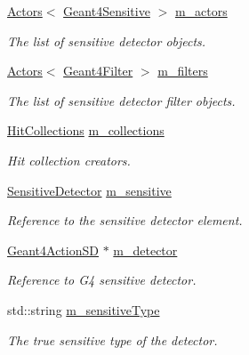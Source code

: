 \begin{DoxyCompactItemize}
\hyperlink{class_d_d4hep_1_1_simulation_1_1_geant4_action_1_1_actors}{Actors}$<$ \hyperlink{class_d_d4hep_1_1_simulation_1_1_geant4_sensitive}{Geant4\+Sensitive} $>$ \hyperlink{class_d_d4hep_1_1_simulation_1_1_geant4_sens_det_action_sequence_aa383f58ddce351dc9df9451bee3feb0f}{m\+\_\+actors}
\begin{DoxyCompactList}\small\item\em The list of sensitive detector objects. \end{DoxyCompactList}\item 
\hyperlink{class_d_d4hep_1_1_simulation_1_1_geant4_action_1_1_actors}{Actors}$<$ \hyperlink{class_d_d4hep_1_1_simulation_1_1_geant4_filter}{Geant4\+Filter} $>$ \hyperlink{class_d_d4hep_1_1_simulation_1_1_geant4_sens_det_action_sequence_a67b12a0e51d5249be593f874182155ab}{m\+\_\+filters}
\begin{DoxyCompactList}\small\item\em The list of sensitive detector filter objects. \end{DoxyCompactList}\item 
\hyperlink{class_d_d4hep_1_1_simulation_1_1_geant4_sens_det_action_sequence_aabeb325e4b6af156cbae3578b00301b3}{Hit\+Collections} \hyperlink{class_d_d4hep_1_1_simulation_1_1_geant4_sens_det_action_sequence_a58c74511f9bef97e83b5a7e54b4917ca}{m\+\_\+collections}
\begin{DoxyCompactList}\small\item\em Hit collection creators. \end{DoxyCompactList}\item 
\hyperlink{class_d_d4hep_1_1_simulation_1_1_geant4_sens_det_action_sequence_a9d428afdc7b9189bce5dab4f16db17fb}{Sensitive\+Detector} \hyperlink{class_d_d4hep_1_1_simulation_1_1_geant4_sens_det_action_sequence_a480029ca979ac872688986da731930b8}{m\+\_\+sensitive}
\begin{DoxyCompactList}\small\item\em Reference to the sensitive detector element. \end{DoxyCompactList}\item 
\hyperlink{class_d_d4hep_1_1_simulation_1_1_geant4_action_s_d}{Geant4\+Action\+SD} $\ast$ \hyperlink{class_d_d4hep_1_1_simulation_1_1_geant4_sens_det_action_sequence_a4c35959bba4b7d3f05a8aa48970be68a}{m\+\_\+detector}
\begin{DoxyCompactList}\small\item\em Reference to G4 sensitive detector. \end{DoxyCompactList}\item 
std\+::string \hyperlink{class_d_d4hep_1_1_simulation_1_1_geant4_sens_det_action_sequence_a51bf2c5186ea7905ae655b44d6aea06f}{m\+\_\+sensitive\+Type}
\begin{DoxyCompactList}\small\item\em The true sensitive type of the detector. \end{DoxyCompactList}\end{DoxyCompactItemize}

